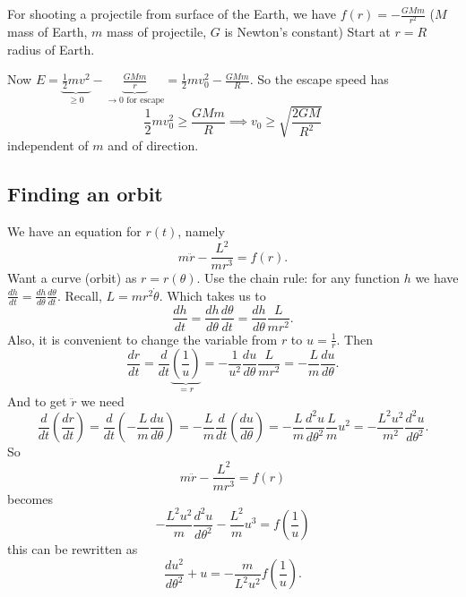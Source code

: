 \documentclass[10pt, a4paper]{article}
\begin{document}
\begin{example}
    For shooting a projectile from surface of the Earth,
    we have $f(r) = -\frac{GMm}{r ^ 2}$
    ($M$ mass of Earth,
    $m$ mass of projectile,
    $G$ is Newton's constant)
    Start at $r = R$ radius of Earth.

    \begin{solution}
        Now $E = \underbrace{\frac{1}{2}mv ^ 2}_{\geq 0} - \underbrace{\frac{GMm}{r}}_{\rightarrow 0\text{ for escape}} = \frac{1}{2}mv_0 ^ 2 - \frac{GMm}{R}$.
        So the escape speed has
        \[
        \frac{1}{2}mv_0 ^ 2 \geq \frac{GMm}{R} \implies v_0 \geq \sqrt{\frac{2GM}{R ^ 2}}
        \]
        independent of $m$ and of direction.
    \end{solution}
\end{example}

\subsection{Finding an orbit}

We have an equation for $r(t)$,
namely
\[
m\ddot{r} - \frac{L ^ 2}{mr ^ 3} = f(r).
\]
Want a curve
(orbit)
as $r = r(\theta)$.
Use the chain rule:
for any function $h$ we have $\frac{dh}{dt} = \frac{dh}{d\theta}\frac{d\theta}{dt}$.
Recall,
$L = mr ^ 2\dot{\theta}$.
Which takes us to
\[
\frac{dh}{dt} = \frac{dh}{d\theta}\frac{d\theta}{dt} = \frac{dh}{d\theta}\frac{L}{mr ^ 2}.
\]
Also,
it is convenient to change the variable from $r$ to $u = \frac{1}{r}$.
Then
\[
\frac{dr}{dt} = \frac{d}{dt}\underbrace{\left(\frac{1}{u}\right)}_{= r} = -\frac{1}{u ^ 2}\frac{du}{d\theta}\frac{L}{mr ^ 2} = -\frac{L}{m}\frac{du}{d\theta}.
\]
And to get $\ddot{r}$ we need
\[
\frac{d}{dt}\left(\frac{dr}{dt}\right) = \frac{d}{dt}\left(-\frac{L}{m}\frac{du}{d\theta}\right) = -\frac{L}{m}\frac{d}{dt}\left(\frac{du}{d\theta}\right) = -\frac{L}{m}\frac{d ^ 2u}{d\theta ^ 2}\frac{L}{m}u ^ 2 = -\frac{L ^ 2u ^ 2}{m ^ 2}\frac{d ^ 2u}{d\theta ^ 2}.
\]
So
\[
m\ddot{r} - \frac{L ^ 2}{mr ^ 3} = f(r)
\]
becomes
\[
-\frac{L ^ 2u ^ 2}{m}\frac{d ^ 2u}{d\theta ^ 2} - \frac{L ^ 2}{m}u ^ 3 = f\left(\frac{1}{u}\right)
\]
this can be rewritten as
\[
\frac{du ^ 2}{d\theta ^ 2} + u = -\frac{m}{L ^ 2u ^ 2}f\left(\frac{1}{u}\right).
\]
\end{document}
